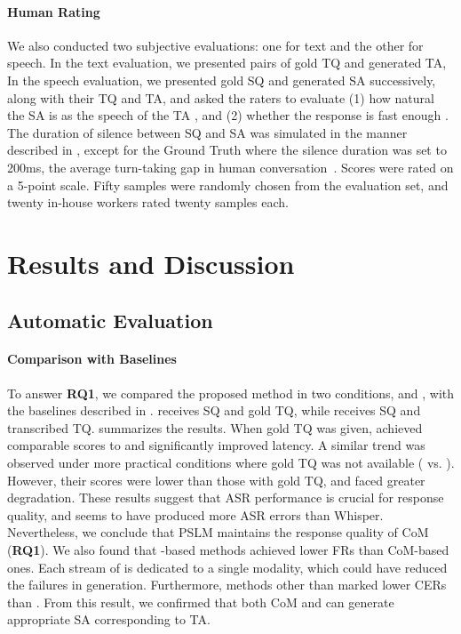 \paragraph{Human Rating}
We also conducted two subjective evaluations: one for text and the other for speech.
In the text evaluation, we presented pairs of gold TQ and generated TA, 
In the speech evaluation, we presented gold SQ and generated SA successively, along with their TQ and TA, and asked the raters to evaluate (1) how natural the SA is as the speech of the TA , and (2) whether the response is fast enough .
The duration of silence between SQ and SA was simulated in the manner described in , except for the Ground Truth where the silence duration was set to 200ms, the average turn-taking gap in human conversation~\citep{levinson2015timing}.
Scores were rated on a 5-point scale.
Fifty samples were randomly chosen from the evaluation set, and twenty in-house workers rated twenty samples each.

\section{Results and Discussion}
\subsection{Automatic Evaluation}
\label{sec:auto_eval}

\paragraph{Comparison with Baselines}
To answer \textbf{RQ1}, we compared the proposed method in two conditions, \method{\prop} and , with the baselines described in .
\method{\prop} receives SQ and gold TQ, while  receives SQ and transcribed TQ.
 summarizes the results.
When gold TQ was given, \method{\prop} achieved comparable scores to  and significantly improved latency.
A similar trend was observed under more practical conditions where gold TQ was not available ( vs. ).
However, their scores were lower than those with gold TQ, and  faced greater degradation.
These results suggest that ASR performance is crucial for response quality, and  seems to have produced more ASR errors than Whisper.
Nevertheless, we conclude that PSLM maintains the response quality of CoM (\textbf{RQ1}).
We also found that \prop-based methods achieved lower FRs than CoM-based ones.
Each stream of \prop is dedicated to a single modality, which could have reduced the failures in generation.
Furthermore, methods other than  marked lower CERs than .
From this result, we confirmed that both CoM and \prop can generate appropriate SA corresponding to TA.

